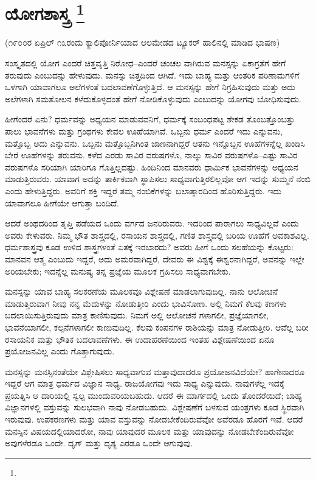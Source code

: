 
\chapter[ಯೋಗಶಾಸ್ತ್ರ ]{ಯೋಗಶಾಸ್ತ್ರ \protect\footnote{}}

\centerline{(೧೯೦೦ರ ಏಪ್ರಿಲ್​ ೧೩ರಂದು ಕ್ಯಾಲಿಪೋರ್ನಿಯಾದ ಆಲಮೇಡದ ಟ್ಯೂಕರ್​ ಹಾಲಿನಲ್ಲಿ ಮಾಡಿದ ಭಾಷಣ)}

ಸಂಸ್ಕೃತದಲ್ಲಿ ಯೋಗ ಎಂದರೆ ಚಿತ್ತವೃತ್ತಿ ನಿರೋಧ–ಎಂದರೆ ಚಂಚಲ ವಾಗಿರುವ ಮನಸ್ಸನ್ನು ಏಕಾಗ್ರತೆಗೆ ಹೇಗೆ ತರುವುದು ಎಂಬುದನ್ನು ಹೇಳುವುದು. ಮನಸ್ಸು ಚಿತ್ತದಿಂದ ಆಗಿದೆ. ಇದು ಬಾಹ್ಯ ಮತ್ತು ಆಂತರಿಕ ಪರಿಣಾಮಗಳಿಗೆ ಒಳಗಾಗಿ ಯಾವಾಗಲೂ ಅಲೆಗಳಂತೆ ಬದಲಾವಣೆಗೊಳ್ಳುತ್ತಿದೆ. ಆ ಮನಸ್ಸನ್ನು ಹೇಗೆ ನಿಗ್ರಹಿಸುವುದು ಮತ್ತು ಅದು ಅಲೆಗಳಾಗಿ ಸಮತೋಲನ ಕಳೆದುಕೊಳ್ಳದಂತೆ ಹೇಗೆ ನೋಡಿಕೊಳ್ಳುವುದು ಎಂಬುದನ್ನು ಯೋಗವು ಬೋಧಿಸುವುದು.

ಹೀಗೆಂದರೆ ಏನು? ಧರ್ಮವನ್ನು ಅಧ್ಯಯನ ಮಾಡುವವನಿಗೆ, ಧರ್ಮಕ್ಕೆ ಸಂಬಂಧಪಟ್ಟ ಶೇಕಡ ತೊಂಬತ್ತೊಂಬತ್ತು ಪಾಲು ಭಾವನೆಗಳು ಮತ್ತು ಗ್ರಂಥಗಳು ಕೇವಲ ಊಹೆಯಾಗಿವೆ. ಒಬ್ಬನು ಧರ್ಮ ಎಂದರೆ ಇದು ಎನ್ನುವನು, ಮತ್ತೊಬ್ಬ ಅದು ಎನ್ನುವನು. ಒಬ್ಬನು ಮತ್ತೊಬ್ಬನಿಗಿಂತ ಜಾಣನಾಗಿದ್ದರೆ ಆತನು ಇನ್ನೊಬ್ಬನ ಊಹೆಗಳನ್ನೆಲ್ಲ ಖಂಡಿಸಿ ಬೇರೆ ಊಹೆಗಳನ್ನು ತರುವನು. ಕಳೆದ ಎರಡು ಸಾವಿರ ವರುಷಗಳೊ, ನಾಲ್ಕು ಸಾವಿರ ವರುಷಗಳೊ–ಎಷ್ಟು ಸಾವಿರ ವರುಷಗಳೊ ಸರಿಯಾಗಿ ಯಾರಿಗೂ ಗೊತ್ತಿಲ್ಲದಷ್ಟು. ಹಿಂದಿನಿಂದ ಮಾನವರು ಧಾರ್ಮಿಕ ಭಾವನೆಗಳನ್ನು ಅಧ್ಯಯನ ಮಾಡುತ್ತಿರುವರು. ಯಾವಾಗ ಅದನ್ನು ತಾರ್ಕಿಕವಾಗಿ ಸ್ಥಾಪಿಸಲು ಸಾಧ್ಯವಾಗುತ್ತಿರಲಿಲ್ಲವೋ ಆಗ ಇದನ್ನು ಸುಮ್ಮನೆ ನಂಬಿ ಎಂದು ಹೇಳುತ್ತಿದ್ದರು. ಅವರಿಗೆ ಶಕ್ತಿ ಇದ್ದರೆ ತಮ್ಮ ನಂಬಿಕೆಗಳನ್ನು ಬಲಾತ್ಕಾರದಿಂದ ಹೊರಿಸುತ್ತಿದ್ದರು. ಇದು ಯಾವಾಗಲೂ ಹೀಗೆಯೇ ಆಗುತ್ತಾ ಬಂದಿದೆ.

ಆದರೆ ಅಂಥದರಿಂದ ತೃಪ್ತಿ ಪಡೆಯದ ಒಂದು ವರ್ಗದ ಜನರಿರುವರು. ಇದರಿಂದ ಪಾರಾಗಲು ಸಾಧ್ಯವಿಲ್ಲವೆ ಎಂದು ಅವರು ಕೇಳುವರು. ನಿಮ್ಮ ಭೌತ ಶಾಸ್ತ್ರದಲ್ಲಿ, ರಸಾಯನ ಶಾಸ್ತ್ರದಲ್ಲಿ, ಗಣಿತ ಶಾಸ್ತ್ರದಲ್ಲಿ ಬರಿಯ ಊಹೆಗೆ ಅವಕಾಶವಿಲ್ಲ. ಧರ್ಮಶಾಸ್ತ್ರವು ಕೂಡ ಉಳಿದ ಶಾಸ್ತ್ರಗಳಂತೆ ಏತಕ್ಕೆ ಇರಬಾರದು? ಅವರು ಹೀಗೆ ಒಂದು ಸಲಹೆಯನ್ನು ಕೊಟ್ಟರು: ಮಾನವನ ಆತ್ಮ ಎಂಬುದು ಇದ್ದರೆ, ಅದು ಅಮರವಾಗಿದ್ದರೆ, ದೇವರು ಈ ವಿಶ್ವಕ್ಕೆ ಈಶ್ವರನಾಗಿದ್ದರೆ, ಅವನನ್ನು ಇಲ್ಲೇ ಅರಿಯಬೇಕು; ಇದನ್ನೆಲ್ಲ ಮನುಷ್ಯ ತನ್ನ ಪ್ರಜ್ಞೆಯ ಮೂಲಕ ಗ್ರಹಿಸಲು ಸಾಧ್ಯವಾಗಬೇಕು.

ಮನಸ್ಸನ್ನು ಯಾವ ಬಾಹ್ಯ ಸಲಕರಣೆಯ ಮೂಲಕವೂ ವಿಶ್ಲೇಷಣೆ ಮಾಡಲಾಗುವುದಿಲ್ಲ. ನಾನು ಆಲೋಚನೆ ಮಾಡುತ್ತಿರುವಾಗ ನೀವು ನನ್ನ ಮೆದುಳನ್ನು ನೋಡುತ್ತೀರಿ ಎಂದು ಭಾವಿಸೋಣ. ಅಲ್ಲಿ ನಿಮಗೆ ಕೆಲವು ಕಣಗಳು ಬದಲಾಯಿಸುತ್ತಿರುವುದು ಮಾತ್ರ ಕಾಣಿಸುವುದು. ನಿಮಗೆ ಅಲ್ಲಿ ಆಲೋಚನೆ ಗಳಾಗಲೀ, ಪ್ರಜ್ಞೆಯಾಗಲೀ, ಭಾವನೆಯಾಗಲೀ, ಕಲ್ಪನೆಗಳಾಗಲೀ ಕಾಣುವುದಿಲ್ಲ. ಕೆಲವು ಕಂಪನಗಳ ರಾಶಿಯನ್ನು ಮಾತ್ರ ನೋಡುತ್ತೀರಿ. ಆವೆಲ್ಲ ಬರೀ ರಸಾಯನಿಕ ಮತ್ತು ಭೌತಿಕ ಬದಲಾವಣೆಗಳು. ಈ ಉದಾಹರಣೆಯಿಂದ ಇಂತಹ ವಿಶ್ಲೇಷಣೆಯಿಂದ ಏನೂ ಪ್ರಯೋಜನವಿಲ್ಲ ಎಂದು ಗೊತ್ತಾಗುವುದು.

ಮನಸ್ಸನ್ನು ಮನಸ್ಸಿನಂತೆಯೇ ವಿಶ್ಲೇಷಿಸಲು ಸಾಧ್ಯವಾಗುವ ಮತ್ತಾವುದಾದರೂ ಪ್ರಯೋಜನವಿದೆಯೇ? ಹಾಗೇನಾದರೂ ಇದ್ದರೆ ಆಗ ಮಾತ್ರ ಧರ್ಮದ ವಿಜ್ಞಾನ ಸಾಧ್ಯ. ರಾಜಯೋಗವು ಇದು ಸಾಧ್ಯ ಎನ್ನುವುದು. ನಾವುಗಳೆಲ್ಲ ಇದಕ್ಕೆ ಪ್ರಯತ್ನಿಸಿ ಆ ದಾರಿಯಲ್ಲಿ ಸ್ವಲ್ಪ ಮುಂದುವರಿಯಬಹುದು. ಆದರೆ ಈ ಮಾರ್ಗದಲ್ಲಿ ಒಂದು ತೊಂದರೆಯಿದೆ; ಬಾಹ್ಯ ವಿಜ್ಞಾನಗಳಲ್ಲಿ ವಸ್ತುವನ್ನು ಸುಲಭವಾಗಿ ನಾವು ನೋಡಬಹುದು. ವಿಶ್ಲೇಷಣೆಗೆ ಬಳಸುವ ಯಂತ್ರಗಳು ಕೂಡ ಸ್ಥಿರವಾಗಿ ಇರುವುವು. ಉಪಕರಣಗಳು ಮತ್ತು ಯಾವ ವಸ್ತುವನ್ನು ನೋಡಬೇಕೆಂದಿರುವೆವೋ ಅವೆರಡೂ ಹೊರಗೆ ಇವೆ. ಆದರೆ ಮನಸ್ಸಿನ ವಿಷಯದಲ್ಲಿಯಾದರೋ, ನಾವು ಯಾವುದರ ಮೂಲಕ ಮತ್ತು ಯಾವುದನ್ನು ನೋಡಬೇಕೆಂದಿರುವೆವೋ ಅವುಗಳೆರಡೂ ಒಂದೇ. ದೃಗ್​ ಮತ್ತು ದೃಶ್ಯ ಎರಡೂ ಒಂದೇ ಆಗುವುವು.

